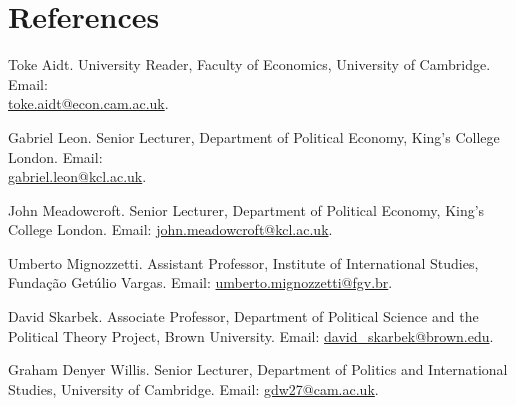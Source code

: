 \documentclass[a4paper]{article}
\renewenvironment{itemize}{
	\begin{list}{}{
			\setlength{\leftmargin}{1.5em}
		}
		}{
	\end{list}
}
\begin{document}
	\section*{References}

	\begin{itemize}

		\item Toke Aidt. University Reader, Faculty of Economics, University of Cambridge. Email: \\ \href{mailto:toke.aidt@econ.cam.ac.uk}{toke.aidt@econ.cam.ac.uk}.
		\item Gabriel Leon. Senior Lecturer, Department of Political Economy, King's College London. Email: \\ \href{mailto:gabriel.leon@kcl.ac.uk}{gabriel.leon@kcl.ac.uk}.
		\item John Meadowcroft. Senior Lecturer, Department of Political Economy, King's College London. Email: \href{mailto:john.meadowcroft@kcl.ac.uk}{john.meadowcroft@kcl.ac.uk}.
		\item Umberto Mignozzetti. Assistant Professor, Institute of International Studies, Funda\c{c}\~{a}o Get\'{u}lio Vargas. Email: \href{umberto.mignozzetti@fgv.br}{umberto.mignozzetti@fgv.br}.
		\item David Skarbek. Associate Professor, Department of Political Science and the Political Theory Project, Brown University. Email: \href{mailto:davidskarbek@gmail.com}{david\_skarbek@brown.edu}.
		\item Graham Denyer Willis. Senior Lecturer, Department of Politics and International Studies, University of Cambridge. Email: \href{mailto:gdw27@cam.ac.uk}{gdw27@cam.ac.uk}.
	\end{itemize}

	\bigskip


	
\end{document}
